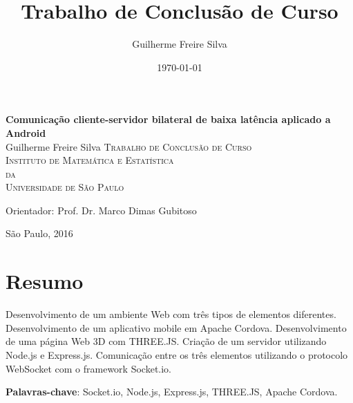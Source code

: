 \documentclass[a4paper,12pt]{article}
\title{Trabalho de Conclusão de Curso}
\author{Guilherme Freire Silva}
\date{\today}
\begin{document}

\thispagestyle{empty}
\begin{center}
    \vspace*{2.3cm}
    \textbf{\Large{Comunicação cliente-servidor bilateral de baixa latência aplicado a Android}}\\


    \vspace*{1.2cm}
    \Large{
        Guilherme Freire Silva
    }
    \vskip 2cm
    \textsc{
     Trabalho de Conclusão de Curso \\[-0.25cm]
    Instituto de Matemática e Estatística\\[-0.25cm]
    da\\[-0.25cm]
    Universidade de São Paulo\\[-0.25cm]%
    }

    \vskip 2.5cm
    Orientador: Prof. Dr. Marco Dimas Gubitoso

    \vskip 3.5cm
    \normalsize{São Paulo, 2016}
\end{center}

\newpage

\newpage
\section{Resumo}

Desenvolvimento de um ambiente Web com três tipos de elementos diferentes. Desenvolvimento de um aplicativo mobile em Apache Cordova. Desenvolvimento de uma página Web 3D com THREE.JS. Criação de um servidor utilizando Node.js e Express.js. Comunicação entre os três elementos utilizando o protocolo WebSocket com o framework Socket.io.

\textbf{Palavras-chave}: Socket.io, Node.js, Express.js, THREE.JS, Apache Cordova.


\newpage
\tableofcontents

\newpage

\renewcommand{\arraystretch}{1.2}
\end{document}

